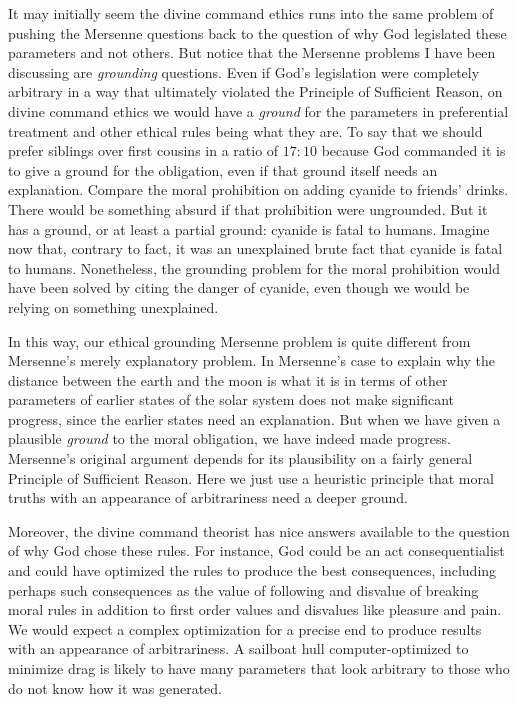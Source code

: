 It may initially seem the divine command ethics runs into the same problem of pushing the Mersenne questions back to the
question of why God legislated these parameters and not others. But notice that the Mersenne problems I have been discussing
are \textit{grounding} questions. Even if God's legislation were completely arbitrary in a way that ultimately violated the
Principle of Sufficient Reason, on divine command ethics we would have a \textit{ground} for the parameters in preferential
treatment and other ethical rules being what they are. To say that we should prefer siblings over first cousins in a ratio
of $17:10$ because God commanded it is to give a ground for the obligation, even if that ground itself needs an explanation.
Compare the moral prohibition on adding cyanide to friends' drinks. There would be something absurd if that prohibition were
ungrounded. But it has a ground, or at least a partial ground: cyanide is fatal to humans. Imagine now that, contrary
to fact, it was an unexplained brute fact that cyanide is fatal to humans. Nonetheless, the grounding problem for the moral prohibition would
have been solved by citing the danger of cyanide, even though we would be relying on something unexplained. 

In this way, our ethical grounding Mersenne problem is quite different from Mersenne's merely explanatory problem. In Mersenne's case
to explain why the distance between the earth and the moon is what it is in terms of other parameters of earlier states of the
solar system does not make significant progress, since the earlier states need an explanation. But when we have given a plausible \textit{ground} to the moral obligation, we have
indeed made progress. Mersenne's original argument depends for its plausibility on a fairly general Principle of Sufficient
Reason. Here we just use a heuristic principle that moral truths with
an appearance of arbitrariness need a deeper ground.

Moreover, the divine command theorist has nice answers available to the question of why God chose these rules. For instance,
God could be an act consequentialist and could have optimized the rules to produce the best consequences, including perhaps
such consequences as the value of following and disvalue of breaking moral rules in addition to first order values and 
disvalues like pleasure and pain.  We would expect a complex optimization for a precise end to produce results with an appearance of arbitrariness.
A sailboat hull computer-optimized to minimize drag is likely to have many parameters that look arbitrary to those who do not
know how it was generated.

